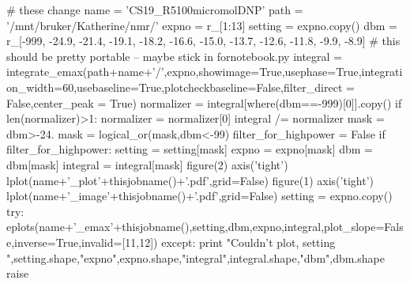 \documentclass[10pt]{article}
\begin{document}
\begin{python}
	# these change
	name = 'CS19_R5100micromolDNP'
	path = '/mnt/bruker/Katherine/nmr/'
	expno = r_[1:13]
	setting = expno.copy()
	dbm = r_[-999,
	  -24.9,
	  -21.4,
	  -19.1,
	  -18.2,
	  -16.6,
	  -15.0,
	  -13.7,
	  -12.6,
	  -11.8,
	  -9.9,
	  -8.9]
	# this should be pretty portable -- maybe stick in fornotebook.py
	integral = integrate_emax(path+name+'/',expno,showimage=True,usephase=True,integration_width=60,usebaseline=True,plotcheckbaseline=False,filter_direct = False,center_peak = True)
	normalizer = integral[where(dbm==-999)[0]].copy()
	if len(normalizer)>1:
	   normalizer = normalizer[0]
	integral /= normalizer
	mask = dbm>-24.
	mask = logical_or(mask,dbm<-99)
	filter_for_highpower = False
	if filter_for_highpower:
	   setting = setting[mask]
	   expno = expno[mask]
	   dbm = dbm[mask]
	   integral = integral[mask]
	figure(2)
	axis('tight')
	lplot(name+'_plot'+thisjobname()+'.pdf',grid=False)
	figure(1)
	axis('tight')
	lplot(name+'_image'+thisjobname()+'.pdf',grid=False)
	setting = expno.copy()
	try:
	   eplots(name+'_emax'+thisjobname(),setting,dbm,expno,integral,plot_slope=False,inverse=True,invalid=[11,12])
	except:
	   print "Couldn't plot, setting ",setting.shape,"expno",expno.shape,"integral",integral.shape,"dbm",dbm.shape
	   raise
\end{python}
\end{document}
